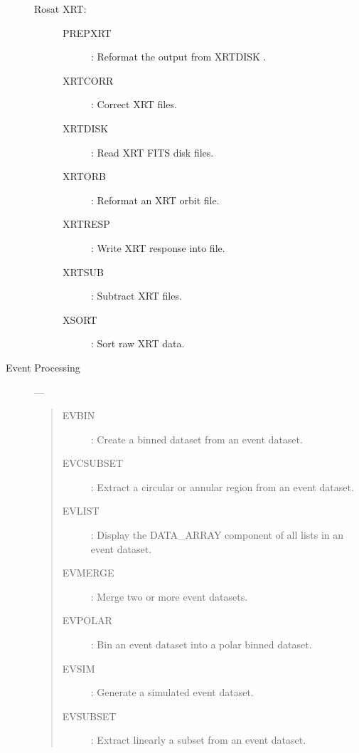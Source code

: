 \begin{description}
\begin{description}
\item [Rosat XRT:]\hfill
\begin{description}
\item [PREPXRT] :  Reformat the output from XRTDISK .
\item [XRTCORR] :  Correct XRT files.
\item [XRTDISK] :  Read XRT FITS disk files.
\item [XRTORB] :   Reformat an XRT orbit file.
\item [XRTRESP] :  Write XRT response into file.
\item [XRTSUB] :   Subtract XRT files.
\item [XSORT] :    Sort raw XRT data.
\end{description}
\end{description}

\item [Event Processing] ---
\begin{quote}
\begin{description}
\item [EVBIN] : Create a binned dataset from an event dataset.
\item [EVCSUBSET] : Extract a circular or annular region from an event dataset.
\item [EVLIST] : Display the DATA\_ARRAY component of all lists in an event dataset.
\item [EVMERGE] : Merge two or more event datasets.
\item [EVPOLAR] :  Bin an event dataset into a polar binned dataset.
\item [EVSIM] : Generate a simulated event dataset.
\item [EVSUBSET] : Extract linearly a subset from an event dataset.
\end{description}
\end{quote}


\end{description}
